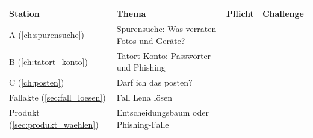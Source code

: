 \begin{center}
	\renewcommand{\arraystretch}{1.4}
	\begin{tabular}{lp{7.2cm}cc}
		\textbf{Station}                          & \textbf{Thema}                                & \textbf{Pflicht}       & \textbf{Challenge}     \\
		\midrule
		A (\cref{ch:spurensuche})                 & Spurensuche: Was verraten Fotos und Geräte?   & \faSquare[regular]     & \faSquare[regular]     \\
		B (\cref{ch:tatort_konto})                & Tatort Konto: Passwörter und Phishing         & \faSquare[regular]     & \faSquare[regular]     \\
		C (\cref{ch:posten})                      & Darf ich das posten?                          & \faSquare[regular]     & \faSquare[regular]     \\
		\midrule
		Fallakte (\cref{sec:fall_loesen})         & Fall Lena lösen                               & \faSquare[regular]     &                        \\
		Produkt (\cref{sec:produkt_waehlen})      & Entscheidungsbaum oder Phishing-Falle         & \faSquare[regular]     &                        \\
	\end{tabular}
\end{center}
